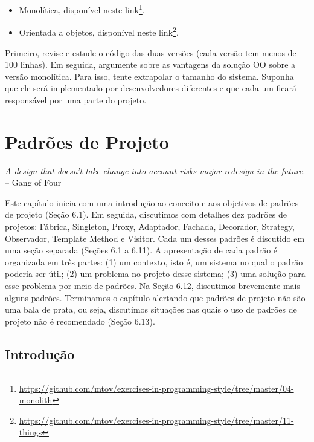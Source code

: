 \documentclass[
  11pt,
  twoside]{book}
\DeclareRobustCommand{\href}[2]{#2\footnote{\url{#1}}}
\renewenvironment{quote}{\centering \vspace{1.5ex} \begin{tcolorbox}[colback=backcolor, width=4.9in]}{\end{tcolorbox}}
\begin{document}
\begin{itemize}
\item
  Monolítica, disponível neste
  \href{https://github.com/mtov/exercises-in-programming-style/tree/master/04-monolith}{link}.
\item
  Orientada a objetos, disponível neste
  \href{https://github.com/mtov/exercises-in-programming-style/tree/master/11-things}{link}.
\end{itemize}

Primeiro, revise e estude o código das duas versões (cada versão tem
menos de 100 linhas). Em seguida, argumente sobre as vantagens da
solução OO sobre a versão monolítica. Para isso, tente extrapolar o
tamanho do sistema. Suponha que ele será implementado por
desenvolvedores diferentes e que cada um ficará responsável por uma
parte do projeto.

\hypertarget{padruxf5es-de-projeto}{%
\chapter{Padrões de Projeto}\label{padruxf5es-de-projeto}}

\begin{quote}
\emph{A design that doesn't take change into account risks major
redesign in the future.} -- Gang of Four
\end{quote}

Este capítulo inicia com uma introdução ao conceito e aos objetivos de
padrões de projeto (Seção 6.1). Em seguida, discutimos com detalhes dez
padrões de projetos: Fábrica, Singleton, Proxy, Adaptador, Fachada,
Decorador, Strategy, Observador, Template Method e Visitor. Cada um
desses padrões é discutido em uma seção separada (Seções 6.1 a 6.11). A
apresentação de cada padrão é organizada em três partes: (1) um
contexto, isto é, um sistema no qual o padrão poderia ser útil; (2) um
problema no projeto desse sistema; (3) uma solução para esse problema
por meio de padrões. Na Seção 6.12, discutimos brevemente mais alguns
padrões. Terminamos o capítulo alertando que padrões de projeto não são
uma bala de prata, ou seja, discutimos situações nas quais o uso de
padrões de projeto não é recomendado (Seção 6.13).

\hypertarget{introduuxe7uxe3o-3}{%
\section{Introdução}\label{introduuxe7uxe3o-3}}

 
\end{document}
